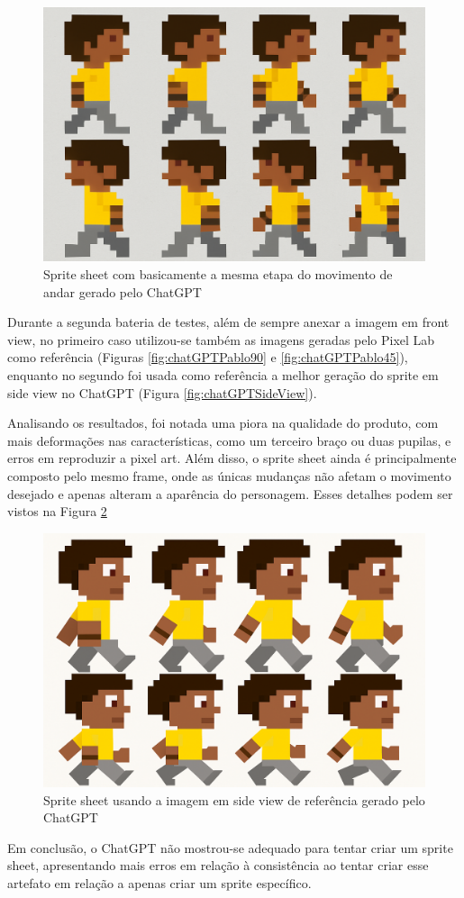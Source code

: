 \begin{figure}[htbp]
    \centering
    \caption{\small Sprite sheet com basicamente a mesma etapa do movimento de andar gerado pelo ChatGPT}
    \label{fig:chatGPTSpriteSheetFront}
    \includegraphics[width=0.6\linewidth]{figs/chatGPT/walking_cycle/front_view/walk cycle 2.png}
\end{figure}

Durante a segunda bateria de testes, além de sempre anexar a imagem em front view, no primeiro caso utilizou-se também as imagens geradas pelo Pixel Lab como referência (Figuras \ref{fig:chatGPTPablo90} e \ref{fig:chatGPTPablo45}), enquanto no segundo foi usada como referência a melhor geração do sprite em side view no ChatGPT (Figura \ref{fig:chatGPTSideView}). 

Analisando os resultados, foi notada uma piora na qualidade do produto, com mais deformações nas características, como um terceiro braço ou duas pupilas, e erros em reproduzir a pixel art. Além disso, o sprite sheet ainda é principalmente composto pelo mesmo frame, onde as únicas mudanças não afetam o movimento desejado e apenas alteram a aparência do personagem. Esses detalhes podem ser vistos na Figura \ref{fig:chatGPTSpriteSheetSide}

\begin{figure}[htbp]
    \centering
    \caption{\small Sprite sheet usando a imagem em side view de referência gerado pelo ChatGPT}
    \label{fig:chatGPTSpriteSheetSide}
    \includegraphics[width=0.6\linewidth]{figs/chatGPT/walking_cycle/side_view/walking cycle 2.png}
\end{figure}

Em conclusão, o ChatGPT não mostrou-se adequado para tentar criar um sprite sheet, apresentando mais erros em relação à consistência ao tentar criar esse artefato em relação a apenas criar um sprite específico.